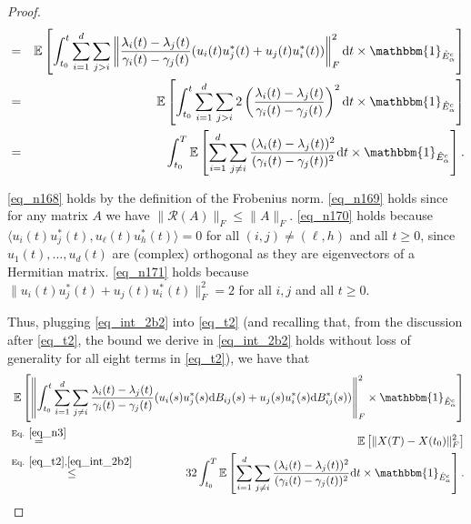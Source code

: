 \documentclass[11pt,letterpaper]{article}
\begin{document}
\begin{proof}
\begin{eqnarray}
            &=& \mathbb{E}\left [ \int_{t_0}^t   \sum_{i=1}^{d} \sum_{j > i}\left \|\frac{\lambda_i(t)- \lambda_j(t)}{\gamma_i(t) - \gamma_j(t)} (u_i(t) u_j^\ast(t) + u_j(t) u_i^\ast(t))\right\|_F^2\mathrm{d}t  \times \mathbbm{1}_{\hat{E}_\alpha^c} \right] \label{eq_n170}\\
%
            &=& \mathbb{E}\left [ \int_{t_0}^t   \sum_{i=1}^{d} \sum_{j > i}2\left(\frac{\lambda_i(t)- \lambda_j(t)}{\gamma_i(t) - \gamma_j(t)}\right)^2\mathrm{d}t  \times \mathbbm{1}_{\hat{E}_\alpha^c} \right] \label{eq_n171}\\
%                                                             
                             &=& \int_{t_0}^{T}   \mathbb{E}\left[ \sum_{i=1}^{d}  \sum_{j \neq i}  \frac{(\lambda_i(t) - \lambda_j(t))^2}{(\gamma_i(t) - \gamma_j(t))^2} \mathrm{d}t \times \mathbbm{1}_{\hat{E}_\alpha^c} \right]. \label{eq_int_2b2}
          \end{eqnarray}

%
%
\noindent
%
\eqref{eq_n168} holds by the definition of the Frobenius norm.
%
\eqref{eq_n169} holds since for any matrix $A$ we have $\|\mathcal{R}(A)\|_F \leq \|A\|_F$.
% 
 \eqref{eq_n170} holds because $\langle u_i(t) u_j^\ast(t),  u_\ell(t) u_h^\ast(t) \rangle = 0$ for all $(i,j) \neq (\ell,h)$ and all $t \geq 0$, since $u_1(t),\ldots, u_d(t)$ are (complex) orthogonal as they are eigenvectors of a Hermitian matrix.
 \eqref{eq_n171} holds because  $\|u_i(t) u_j^\ast(t) + u_j(t) u_i^\ast(t)\|_F^2 = 2$ for all $i,j$ and all $t \geq 0$.
% 

Thus, plugging \eqref{eq_int_2b2} into \eqref{eq_t2} (and recalling that, from the discussion after \eqref{eq_t2}, the bound we derive in \eqref{eq_int_2b2} holds without loss of generality for all eight terms in \eqref{eq_t2}), we have that
%
\begin{eqnarray}\label{eq_int_2}
    & &  \!\!\!\!\!\!\!\!\!\!\!\!\!\!\!\!\!\!\! \! \!\!\!\!\!\!\!\!\!\!\!\!\!\!\!\! \! \!\!\!\!\!\!\!\!\!\!\!\!\!\!\!\! \! \!\!\!\!\!\!\!\!\!\!\!\!\!\!\! \mathbb{E}\left[ \left\|\int_{t_0}^{t}\sum_{i=1}^{d} \sum_{j \neq i} \frac{\lambda_i(t)- \lambda_j(t)}{\gamma_i(t) - \gamma_j(t)}(u_i(s) u_j^\ast(s)\mathrm{d}B_{ij}(s) + u_j(s) u_i^\ast(s)\mathrm{d}B_{ij}^\ast(s))\right\|_F^2 \times \mathbbm{1}_{\hat{E}_\alpha^c} \right]\nonumber\\
    &\stackrel{\textrm{Eq. } \eqref{eq_n3}}{=}&\mathbb{E}\left[ \|X(T) - X(t_0)\|_F^2 \right ]\nonumber\\
    &\stackrel{\textrm{Eq. } \eqref{eq_t2}, \eqref{eq_int_2b2}}{\leq}& 32\int_{t_0}^{T}   \mathbb{E}\left[ \sum_{i=1}^{d}  \sum_{j \neq i}  \frac{(\lambda_i(t) - \lambda_j(t))^2}{(\gamma_i(t) - \gamma_j(t))^2} \mathrm{d}t \times \mathbbm{1}_{\hat{E}_\alpha^c} \right].
    \end{eqnarray}
          




\end{proof}
\end{document}

